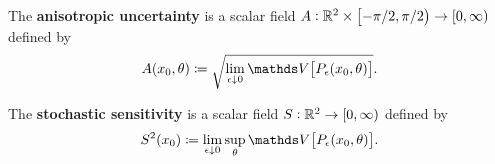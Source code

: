 \begin{definition}
	\begin{alpharate}
		\item The \textbf{anisotropic uncertainty} is a scalar field \(A: \mathbb{R}^2\times\left[-\pi/2, \pi/2\right) \to [0,\infty)\) defined by
		\[
			A\!\left(x_0,\theta\right) \coloneqq \sqrt{\lim_{\epsilon\downarrow 0}\var{P_\epsilon\!\left(x_0,\theta\right)}}.
		\]

		\item The \textbf{stochastic sensitivity} is a scalar field \(S: \mathbb{R}^2 \to [0,\infty)\) defined by
		\[
			S^2\!\left(x_0\right) \coloneqq \lim_{\epsilon\downarrow 0}\sup_{\theta}{\var{P_\epsilon\!\left(x_0,\theta\right)}}.
		\]
	\end{alpharate}
\end{definition}

